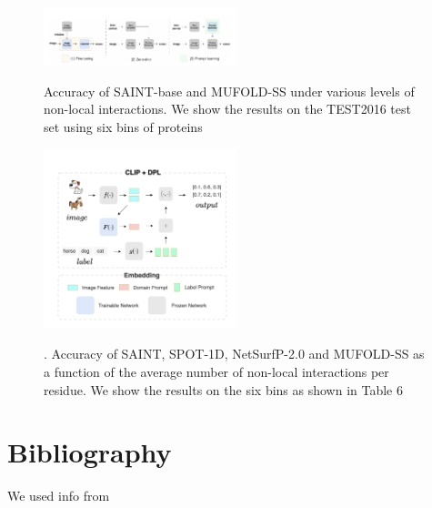 \documentclass{article}
\begin{document}

\begin{multicols}{2}

\pagebreak
\begin{figure}[H]
         \centering
         \includegraphics[width=0.5\textwidth]{2.png}
         \label{fig:three sin x}
         \caption{Accuracy of SAINT-base and MUFOLD-SS under various levels of non-local interactions. We show the results on the TEST2016 test set using six bins of proteins}
\end{figure}
\begin{figure}[H]
         \centering
         \includegraphics[width=0.5\textwidth]{3.png}
         \label{fig:three sin x}
         \caption{. Accuracy of SAINT, SPOT-1D, NetSurfP-2.0 and MUFOLD-SS as a function of the average number of non-local interactions per residue. We show the results on the six bins as shown in Table 6}
\end{figure}

\end{multicols}
\section{Bibliography}
We used info from \cite{arjovsky2019invariant}
\printbibliography
\end{document}
